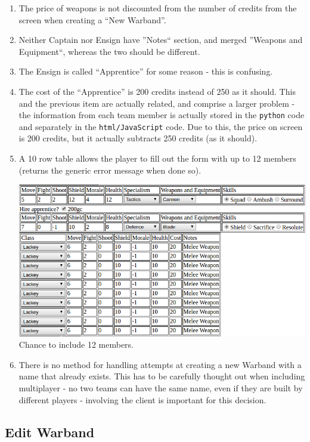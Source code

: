 \documentclass[12pt,a4paper]{article}
\begin{document}
\begin{enumerate}
 \item The price of weapons is not discounted from the number of credits from the screen when creating a ``New Warband''.
 \item Neither Captain nor Ensign have ''Notes`` section, and merged ''Weapons and Equipment``, whereas the two should be different.
 \item The Ensign is called ``Apprentice'' for some reason - this is confusing.
 \item The cost of the ``Apprentice'' is 200 credits instead of 250 as it should. This and the previous item are actually related, and comprise a larger problem - the information from each team member is actually stored in the \texttt{python} code and separately in the \texttt{html/JavaScript} code. Due to this, the price on screen is 200 credits, but it actually subtracts 250 credits (as it should). 
 \item A 10 row table allows the player to fill out the form with up to 12 members (returns the generic error message when done so).\\
 \begin{minipage}[t]{\linewidth}
 \centering
 \includegraphics[width=1\textwidth]{img/twelve_members}
 Chance to include 12 members.
 \end{minipage}
 
 \item There is no method for handling attempts at creating a new Warband with a name that already exists. This has to be carefully thought out when including multiplayer - no two teams can have the same name, even if they are built by different players - involving the client is important for this decision.

\end{enumerate}

\subsection{Edit Warband}
\end{document}
